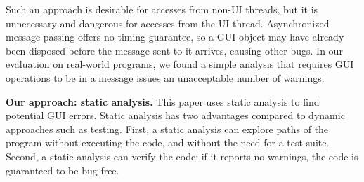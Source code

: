 Such an approach is desirable for accesses from non-UI threads, but it is unnecessary
and dangerous for accesses from the UI thread. Asynchronized message passing offers
no timing guarantee, so a GUI object may have already been
disposed before the message sent to it arrives, causing other bugs. 
In our evaluation on real-world programs, we found a simple analysis that
requires GUI operations to be in a message issues
an unacceptable number of warnings. %




\smallskip

\textbf{Our approach: static analysis.}
This paper uses static analysis to find potential GUI errors.
Static analysis has two advantages compared to dynamic approaches such as
 testing. First, a static analysis can explore paths of the program without
executing the code, and without the need for a test suite.
Second, a static analysis can verify the code: if it
reports no warnings, the code is guaranteed to be bug-free. 


